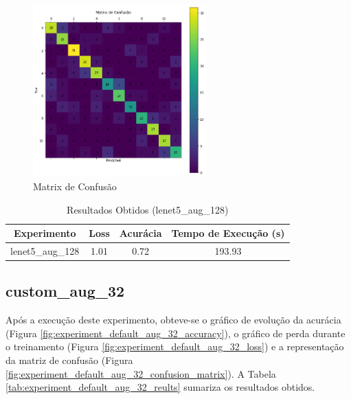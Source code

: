 \documentclass[12pt]{article}
\begin{document}
\begin{figure}[!htb]
  \centering
  \includegraphics[width=18em]{experiments/lenet5_aug_128/confusion_matrix.png}
  \caption{Matrix de Confusão}
  \label{fig:experiment_lenet5_aug_128_confusion_matrix}
\end{figure}

\begin{table}[!htb]
  \centering
  \begin{tabular}{|c|c|c|c|}
    \hline
    \textbf{Experimento} & \textbf{Loss} & \textbf{Acurácia} & \textbf{Tempo de Execução (s)} \\ \hline
    lenet5\_aug\_128     & 1.01          & 0.72              & 193.93                         \\ \hline
  \end{tabular}
  \caption{Resultados Obtidos (lenet5\_aug\_128)}
  \label{tab:experiment_lenet5_aug_128_reults}
\end{table}

\subsection{custom\_aug\_32}

Após a execução deste experimento, obteve-se o gráfico de evolução da acurácia (Figura \ref{fig:experiment_default_aug_32_accuracy}), o gráfico de perda durante o treinamento (Figura \ref{fig:experiment_default_aug_32_loss}) e a representação da matriz de confusão (Figura \ref{fig:experiment_default_aug_32_confusion_matrix}). A Tabela \ref{tab:experiment_default_aug_32_reults} sumariza os resultados obtidos.
\end{document}
